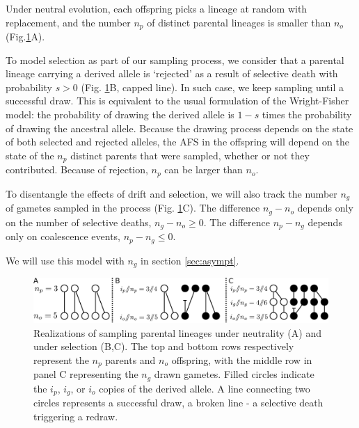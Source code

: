 \documentclass[review]{elsarticle}
\begin{document}
Under neutral evolution, each offspring picks a lineage at random with replacement, and the number
$n_p$ of distinct parental lineages is smaller than $n_o$ (Fig.\ref{fig:schematic}A).

To model selection as part of our sampling process, we consider that a parental lineage carrying a derived allele 
is `rejected' as a result of selective death with probability $s>0$
(Fig. \ref{fig:schematic}B, capped line). In such case, we keep sampling until a successful draw.  
This is equivalent to the usual formulation of the Wright-Fisher model: the probability of drawing 
the derived allele is $1-s$ times the probability of drawing the ancestral allele. 
Because the drawing process depends on the state of both selected and rejected alleles, 
the AFS in the offspring will depend on the state of the $n_p$ distinct parents that were sampled,
whether or not they contributed. Because of rejection, $n_p$ can be larger than $n_o.$

To disentangle the effects of drift and selection, we will also track the number $n_g$ of gametes
sampled in the process (Fig. \ref{fig:schematic}C). The difference $n_g-n_o$ depends only on the
number of selective deaths, $n_g-n_o \ge 0$. The difference $n_p-n_g$ depends only on
coalescence events, $n_p-n_g \le 0$.

We will use this model with $n_g$ in section
\ref{sec:asympt}.

\begin{figure}[h]
  \centering
  \includegraphics[width=1.0\textwidth]{fig/schematic.pdf}
  \caption{\label{fig:schematic} Realizations of sampling parental lineages under neutrality (A) and
    under selection (B,C). The top and bottom rows respectively represent the $n_p$ parents and $n_o$ offspring, 
    with the middle row in panel C representing the $n_g$ drawn gametes.
    Filled circles indicate the $i_p$, $i_g$, or $i_o$ copies of the derived allele. A line connecting
    two circles represents a successful draw, a broken line - a selective death triggering a redraw.
    }
\end{figure}
\end{document}
